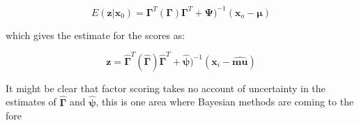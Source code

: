 \begin{displaymath}
E(\boldsymbol{z} | \boldsymbol{x}_{0}) =  \boldsymbol{\Gamma}^{T}(\boldsymbol{\Gamma})\boldsymbol{\Gamma}^{T} + \boldsymbol{\Psi})^{-1}(\boldsymbol{x}_{o} - \boldsymbol{\mu})
\end{displaymath}

which gives the estimate for the scores as:

\begin{equation}
\boldsymbol{z} =  \boldsymbol{\hat{\Gamma}}^{T}(\boldsymbol{\hat{\Gamma}})\boldsymbol{\hat{\Gamma}}^{T} + \boldsymbol{\hat{\psi}})^{-1}(\boldsymbol{x}_{i} - \boldsymbol{\hat{mu}})
\end{equation}

It might be clear that factor scoring takes no account of uncertainty in the estimates of $\boldsymbol{\hat{\Gamma}}$ and $ \boldsymbol{\hat{\psi}}$, this is one area where Bayesian methods are coming to the fore \citep{Aitkin+Aitkin:2005}





